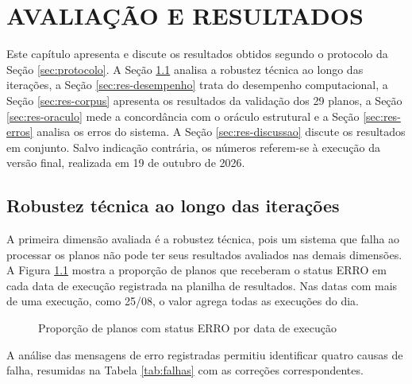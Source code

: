 \chapter{AVALIAÇÃO E RESULTADOS}
\label{cap:resultados}

Este capítulo apresenta e discute os resultados obtidos segundo o protocolo da Seção \ref{sec:protocolo}. A Seção \ref{sec:res-robustez} analisa a robustez técnica ao longo das iterações, a Seção \ref{sec:res-desempenho} trata do desempenho computacional, a Seção \ref{sec:res-corpus} apresenta os resultados da validação dos 29 planos, a Seção \ref{sec:res-oraculo} mede a concordância com o oráculo estrutural e a Seção \ref{sec:res-erros} analisa os erros do sistema. A Seção \ref{sec:res-discussao} discute os resultados em conjunto. Salvo indicação contrária, os números referem-se à execução da versão final, realizada em 19 de outubro de 2026.

\section{Robustez técnica ao longo das iterações}
\label{sec:res-robustez}

A primeira dimensão avaliada é a robustez técnica, pois um sistema que falha ao processar os planos não pode ter seus resultados avaliados nas demais dimensões. A Figura \ref{fig:evolucao} mostra a proporção de planos que receberam o status ERRO em cada data de execução registrada na planilha de resultados. Nas datas com mais de uma execução, como 25/08, o valor agrega todas as execuções do dia.

\begin{figure}[htbp]
\centering
\caption{Proporção de planos com status ERRO por data de execução}
\label{fig:evolucao}

\end{figure}

A análise das mensagens de erro registradas permitiu identificar quatro causas de falha, resumidas na Tabela \ref{tab:falhas} com as correções correspondentes.

